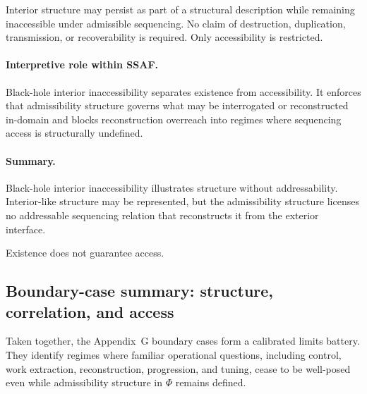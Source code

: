 \documentclass[aps,prx,onecolumn,11pt]{revtex4-2}
\theoremstyle{plain}
\theoremstyle{definition}
\theoremstyle{remark}
\begin{document}
Interior structure may persist as part of a structural description while
remaining inaccessible under admissible sequencing. No claim of
destruction, duplication, transmission, or recoverability is required.
Only accessibility is restricted.

\paragraph{Interpretive role within SSAF.}

Black-hole interior inaccessibility separates existence from
accessibility. It enforces that admissibility structure governs what may
be interrogated or reconstructed in-domain and blocks reconstruction
overreach into regimes where sequencing access is structurally
undefined.

\paragraph{Summary.}

Black-hole interior inaccessibility illustrates structure without
addressability. Interior-like structure may be represented, but the
admissibility structure licenses no addressable sequencing relation that
reconstructs it from the exterior interface.

Existence does not guarantee access.

\subsection{Boundary-case summary: structure, correlation, and access}

Taken together, the Appendix~G boundary cases form a calibrated limits
battery. They identify regimes where familiar operational questions,
including control, work extraction, reconstruction, progression, and
tuning, cease to be well-posed even while admissibility structure in
\(\Phi\) remains defined.
\end{document}

